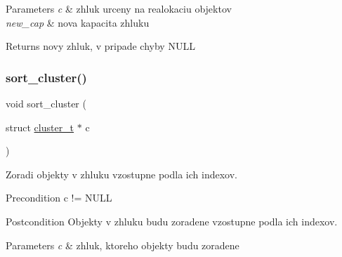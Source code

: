 \begin{DoxyParams}{Parameters}
{\em c} & zhluk urceny na realokaciu objektov \\
\hline
{\em new\+\_\+cap} & nova kapacita zhluku \\
\hline
\end{DoxyParams}
\begin{DoxyReturn}{Returns}
novy zhluk, v pripade chyby N\+U\+LL 
\end{DoxyReturn}
\mbox{\label{group__clust_ga12718af9e3e31b61bf703ec260e22450}} 
\subsubsection{\texorpdfstring{sort\+\_\+cluster()}{sort\_cluster()}}
{\footnotesize\ttfamily void sort\+\_\+cluster (\begin{DoxyParamCaption}\item[{struct \hyperlink{structcluster__t}{cluster\+\_\+t} $\ast$}]{c }\end{DoxyParamCaption})}

Zoradi objekty v zhluku vzostupne podla ich indexov.

\begin{DoxyPrecond}{Precondition}
c != N\+U\+LL
\end{DoxyPrecond}
\begin{DoxyPostcond}{Postcondition}
Objekty v zhluku budu zoradene vzostupne podla ich indexov. 
\end{DoxyPostcond}

\begin{DoxyParams}{Parameters}
{\em c} & zhluk, ktoreho objekty budu zoradene \\
\hline
\end{DoxyParams}
